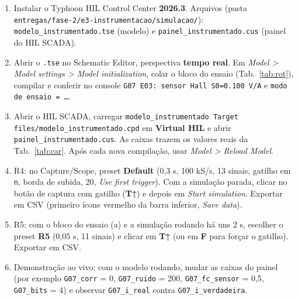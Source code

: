 \documentclass[10pt,a4paper]{article}
\newcommand{\R}[1]{\FloatBarrier\par\medskip\noindent{\large\bfseries #1}\par\smallskip}
\begin{document}
\R{R6. Repetibilidade (roteiro)}
\begin{enumerate}
\item Instalar o Typhoon HIL Control Center \textbf{2026.3}. Arquivos (pasta \texttt{entregas/fase-2/e3-instrumentacao/simulacao/}): \texttt{modelo\_instrumentado.tse} (modelo) e \texttt{painel\_instrumentado.cus} (painel do HIL SCADA).
\item Abrir o \texttt{.tse} no Schematic Editor, perspectiva \textbf{tempo real}. Em \emph{Model > Model settings > Model initialization}, colar o bloco do ensaio (Tab.~\ref{tab:rot}), compilar e conferir no console \texttt{G07 E03: sensor Hall S0=0.100 V/A} e \texttt{modo de ensaio = …}.
\item Abrir o HIL SCADA, carregar \texttt{modelo\_instrumentado Target files/modelo\_instrumentado.cpd} em \textbf{Virtual HIL} e abrir \texttt{painel\_instrumentado.cus}. As caixas trazem os valores reais da Tab.~\ref{tab:car}. Após cada nova compilação, usar \emph{Model > Reload Model}.
\item R4: no Capture/Scope, preset \textbf{Default} (0,3 s, 100 kS/s, 13 sinais, gatilho em \texttt{n}, borda de subida, 20, \emph{Use first trigger}). Com a simulação parada, clicar no botão de captura com gatilho (\textbf{T↑}) e depois em \emph{Start simulation}. Exportar em CSV (primeiro ícone vermelho da barra inferior, \emph{Save data}).
\item R5: com o bloco do ensaio (a) e a simulação rodando há uns 2 s, escolher o preset \textbf{R5} (0,05 s, 11 sinais) e clicar em \textbf{T↑} (ou em \textbf{F} para forçar o gatilho). Exportar em CSV.
\item Demonstração ao vivo: com o modelo rodando, mudar as caixas do painel (por exemplo \texttt{G07\_corr} = 0, \texttt{G07\_ruido} = 200, \texttt{G07\_fc\_sensor} = 0,5, \texttt{G07\_bits} = 4) e observar \texttt{G07\_i\_real} contra \texttt{G07\_i\_verdadeira}.
\end{enumerate}
\end{document}
